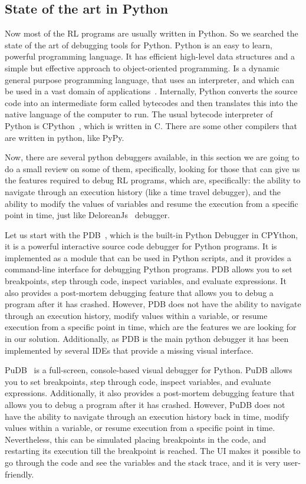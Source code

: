 \subsection{State of the art in Python}
\label{sec:py}
Now most of the \ac{RL} programs are usually written in Python. So we searched the state 
of the art of debugging tools for Python. Python is an easy to learn, 
powerful programming language. It has efficient high-level data structures and a simple 
but effective approach to object-oriented programming. Is a dynamic general purpose 
programming language, that uses an interpreter, and which can be used in a vast domain 
of applications~\cite{swaroop15}. Internally, Python converts the source code 
into an intermediate form called bytecodes and then translates this into the native 
language of the computer to run. The usual bytecode interpreter of Python 
is CPython~\cite{shaw21}, which is written in C. There are some 
other compilers that are written in python, like PyPy.

Now, there are several python debuggers available, in this section we are going to do a 
small review on some of them, specifically, looking for those that can give us the features 
required to debug \ac{RL} programs, which are, specifically: the ability to navigate through
an execution history (like a time travel debugger), and the ability to modify the values
of variables and resume the execution from a specific point in time, just like 
DeloreanJs~\cite{leger23} debugger.

Let us start with the \ac{PDB}~\cite{python-pdb}, which is the built-in Python Debugger in CPYthon, it is a 
powerful interactive source code debugger for Python programs. It is implemented as a 
module that can be used in Python scripts, and it provides a command-line interface 
for debugging Python programs. \ac{PDB} allows you to set breakpoints, step through 
code, inspect variables, and evaluate expressions. It also provides a post-mortem 
debugging feature that allows you to debug a program after it has crashed. However, 
\ac{PDB} does not have the ability to navigate through an execution history, modify 
values within a variable, or resume execution from a specific point in time, which 
are the features we are looking for in our solution. Additionally, as \ac{PDB} is the main 
python debugger it has been implemented by several IDEs that provide a missing visual 
interface.

PuDB~\cite{pudb} is a full-screen, console-based visual 
debugger for Python. PuDB allows you to set breakpoints, step through code, inspect 
variables, and evaluate expressions. Additionally, it also provides a post-mortem debugging feature 
that allows you to debug a program after it has crashed. However, PuDB does not 
have the ability to navigate through an execution history back in time, modify values 
within a variable, or resume execution from a specific point in time. Nevertheless, this 
can be simulated placing breakpoints in the code, and restarting its execution till the 
breakpoint is reached. The UI makes it possible to go through the code and see the 
variables and the stack trace, and it is very user-friendly.

